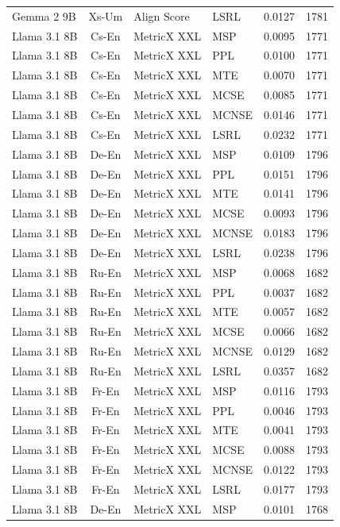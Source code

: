 \begin{table}
\begin{tabular}{lc}
Gemma 2 9B & Xs-Um & Align Score & LSRL & 0.0127 & 1781 \\
Llama 3.1 8B & Cs-En & MetricX XXL & MSP & 0.0095 & 1771 \\
Llama 3.1 8B & Cs-En & MetricX XXL & PPL & 0.0100 & 1771 \\
Llama 3.1 8B & Cs-En & MetricX XXL & MTE & 0.0070 & 1771 \\
Llama 3.1 8B & Cs-En & MetricX XXL & MCSE & 0.0085 & 1771 \\
Llama 3.1 8B & Cs-En & MetricX XXL & MCNSE & 0.0146 & 1771 \\
Llama 3.1 8B & Cs-En & MetricX XXL & LSRL & 0.0232 & 1771 \\
Llama 3.1 8B & De-En & MetricX XXL & MSP & 0.0109 & 1796 \\
Llama 3.1 8B & De-En & MetricX XXL & PPL & 0.0151 & 1796 \\
Llama 3.1 8B & De-En & MetricX XXL & MTE & 0.0141 & 1796 \\
Llama 3.1 8B & De-En & MetricX XXL & MCSE & 0.0093 & 1796 \\
Llama 3.1 8B & De-En & MetricX XXL & MCNSE & 0.0183 & 1796 \\
Llama 3.1 8B & De-En & MetricX XXL & LSRL & 0.0238 & 1796 \\
Llama 3.1 8B & Ru-En & MetricX XXL & MSP & 0.0068 & 1682 \\
Llama 3.1 8B & Ru-En & MetricX XXL & PPL & 0.0037 & 1682 \\
Llama 3.1 8B & Ru-En & MetricX XXL & MTE & 0.0057 & 1682 \\
Llama 3.1 8B & Ru-En & MetricX XXL & MCSE & 0.0066 & 1682 \\
Llama 3.1 8B & Ru-En & MetricX XXL & MCNSE & 0.0129 & 1682 \\
Llama 3.1 8B & Ru-En & MetricX XXL & LSRL & 0.0357 & 1682 \\
Llama 3.1 8B & Fr-En & MetricX XXL & MSP & 0.0116 & 1793 \\
Llama 3.1 8B & Fr-En & MetricX XXL & PPL & 0.0046 & 1793 \\
Llama 3.1 8B & Fr-En & MetricX XXL & MTE & 0.0041 & 1793 \\
Llama 3.1 8B & Fr-En & MetricX XXL & MCSE & 0.0088 & 1793 \\
Llama 3.1 8B & Fr-En & MetricX XXL & MCNSE & 0.0122 & 1793 \\
Llama 3.1 8B & Fr-En & MetricX XXL & LSRL & 0.0177 & 1793 \\
Llama 3.1 8B & De-En & MetricX XXL & MSP & 0.0101 & 1768 \\

\end{tabular}
\end{table}
